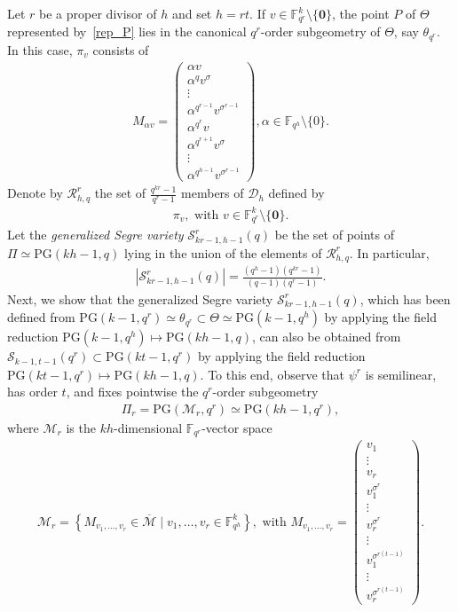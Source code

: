 \documentclass[11pt]{article}
\theoremstyle{definition}
\numberwithin{equation}{section}
\def\0{\mathbf 0}
\def\cM{\mathcal M}
\def\cD{\mathcal D}
\def\cR{\mathcal R}
\def\cS{\mathcal S}
\def\PG{\mathrm{PG}}
\def\F{{\mathbb F}}
\begin{document}
Let $r$ be a proper divisor of $h$ and set $h = rt$. If $v \in \F_{q^r}^k \setminus \{\0\}$, the point $P$ of $\Theta$ represented by~\eqref{rep_P} lies in the canonical $q^r$-order subgeometry of $\Theta$, say $\theta_{q^r}$. In this case, $\pi_v$ consists of 
\begin{align*}
M_{\alpha v} = 
\begin{pmatrix}
\alpha v \\
\alpha^q v^{\sigma} \\
\vdots \\
\alpha^{q^{r-1}} v^{\sigma^{r-1}} \\
\alpha^{q^{r}} v \\
\alpha^{q^{r+1}} v^{\sigma} \\
\vdots \\
\alpha^{q^{h-1}} v^{\sigma^{r-1}} 
\end{pmatrix}, \alpha \in \F_{q^h} \setminus \{0\}.
\end{align*}
Denote by $\cR^r_{h, q}$ the set of $\frac{q^{kr}-1}{q^r-1}$ members of $\cD_h$ defined by 
\begin{align*}
\pi_v, \mbox{ with } v \in \F_{q^r}^k \setminus \{\0\}.
\end{align*}
Let the {\em generalized Segre variety} $\cS^r_{kr-1,h-1}(q)$ be the set of points of $\Pi \simeq \PG(kh-1, q)$ lying in the union of the elements of $\cR^r_{h, q}$. In particular,
\begin{align*}
\left|\cS^r_{kr-1, h-1}(q)\right| = \frac{(q^h-1)(q^{kr}-1)}{(q-1)(q^r-1)}.
\end{align*}
Next, we show that the generalized Segre variety $\cS^r_{kr-1, h-1}(q)$, which has been defined from $\PG(k-1, q^r) \simeq \theta_{q^r} \subset \Theta \simeq \PG(k-1, q^h)$ by applying the field reduction $\PG(k-1,q^h) \mapsto \PG(kh-1, q)$, can also be obtained from $\cS_{k-1, t-1}(q^r) \subset \PG(kt-1, q^r)$ by applying the field reduction $\PG(kt-1,q^r) \mapsto \PG(kh-1, q)$. %
To this end, observe that $\psi^r$ is semilinear, has order $t$, and fixes pointwise the $q^r$-order subgeometry 
\begin{align*}
\Pi_r = \PG(\cM_r, q^r) \simeq \PG(kh-1, q^r), 
\end{align*}
where $\cM_r$ is the $kh$-dimensional $\F_{q^r}$-vector space 
\begin{align*}
\cM_r = \left\{M_{v_1, \dots, v_r} \in \overline{\cM}  \mid v_1, \dots, v_r \in \F_{q^h}^k\right\}, \mbox{ with } 
M_{v_1, \dots, v_r} = 
\begin{pmatrix}
v_1 \\
\vdots \\
v_r \\
v_1^{\sigma^r} \\
\vdots \\
v_r^{\sigma^r} \\
\vdots \\
v_1^{\sigma^{r(t-1)}} \\
\vdots \\
v_r^{\sigma^{r(t-1)}}  
\end{pmatrix}.
\end{align*}
\end{document}
